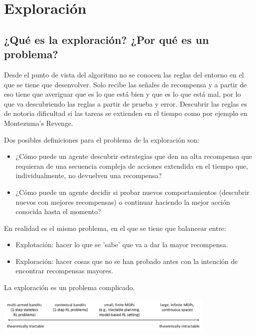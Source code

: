 \chapter{Exploración}%
\label{cha:exploración}


\section{¿Qué es la exploración? ¿Por qué es un problema?}%
\label{sec:_qué_es_la_exploración_por_qué_es_un_problema_}

Desde el punto de vista del algoritmo no se conocen las reglas del entorno en el que se tiene
que desenvolver. Solo recibe las señales de recompensa y a partir de eso tiene que averiguar
que es lo que está bien y que es lo que está mal, por lo que va descubriendo las reglas a partir
de prueba y error. Descubrir las reglas es de notoria dificultad si las tareas se extienden
en el tiempo como por ejemplo en Montezuma's Revenge.

Dos posibles definiciones para el problema de la exploración son:
\begin{itemize}
    \item ¿Cómo puede un agente descubrir estrategias que den na alta recompensa que
        requieran de una secuencia compleja de acciones extendida en el tiempo que,
        individualmente, no devuelven una recompensa?
    \item ¿Cómo puede un agente decidir si probar nuevos comportamientos (descubrir nuevos
        con mejores recompensas) o continuar haciendo la mejor acción conocida hasta el
        momento?
\end{itemize}

En realidad es el mismo problema, en el que se tiene que balancear entre:
\begin{itemize}
    \item Explotación: hacer lo que se 'sabe' que va a dar la mayor recompensa.
    \item Exploración: hacer cosas que no se han probado antes con la intención de
        encontrar recompensas mayores.
\end{itemize}

La exploración es un problema complicado.

\begin{center}
\includegraphics[width=0.8\textwidth]{figures/2020-07-14-165551_940x151_scrot.png}
\end{center}

